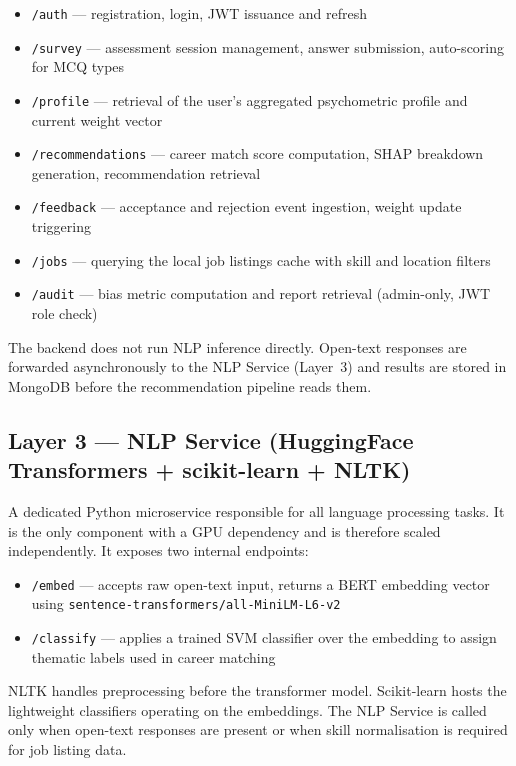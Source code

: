 \begin{itemize}
  \item \texttt{/auth} --- registration, login, JWT issuance and refresh
  \item \texttt{/survey} --- assessment session management, answer submission,
        auto-scoring for MCQ types
  \item \texttt{/profile} --- retrieval of the user's aggregated psychometric
        profile and current weight vector
  \item \texttt{/recommendations} --- career match score computation, SHAP
        breakdown generation, recommendation retrieval
  \item \texttt{/feedback} --- acceptance and rejection event ingestion, weight
        update triggering
  \item \texttt{/jobs} --- querying the local job listings cache with skill and
        location filters
  \item \texttt{/audit} --- bias metric computation and report retrieval
        (admin-only, JWT role check)
\end{itemize}

The backend does not run NLP inference directly. Open-text responses are
forwarded asynchronously to the NLP Service (Layer~3) and results are stored
in MongoDB before the recommendation pipeline reads them.

\subsection*{Layer 3 --- NLP Service (HuggingFace Transformers + scikit-learn + NLTK)}

A dedicated Python microservice responsible for all language processing tasks.
It is the only component with a GPU dependency and is therefore scaled
independently. It exposes two internal endpoints:

\begin{itemize}
  \item \texttt{/embed} --- accepts raw open-text input, returns a BERT
        embedding vector using \texttt{sentence-transformers/all-MiniLM-L6-v2}
  \item \texttt{/classify} --- applies a trained SVM classifier over the
        embedding to assign thematic labels used in career matching
\end{itemize}

NLTK handles preprocessing before the transformer model. Scikit-learn hosts
the lightweight classifiers operating on the embeddings. The NLP Service is
called only when open-text responses are present or when skill normalisation
is required for job listing data.

